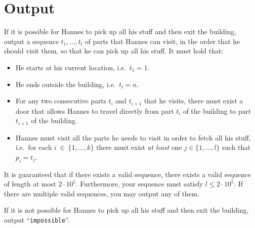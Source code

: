 \section*{Output}
If it is possible for Hannes to pick up all his stuff and then exit the
building, output a sequence $t_1,\ldots,t_l$ of parts that Hannes can visit, in
the order that he should visit them, so that he can pick up all his stuff. It
must hold that:
\begin{itemize}
    \item He starts at his current location, i.e.\ $t_1 = 1$.
    \item He ends outside the building, i.e.\ $t_l = n$.
    \item For any two consecutive parts $t_i$ and $t_{i+1}$ that he visits,
    there must exist a door that allows Hannes to travel directly from part $t_i$
    of the building to part $t_{i+1}$ of the building.
    \item Hannes must visit all the parts he needs to visit in order to fetch
    all his stuff, i.e.\ for each $i~\in~\{1,\ldots,k\}$ there must exist
    \emph{at least} one $j\in\{1,\ldots,l\}$ such that $p_i = t_j$.
\end{itemize}

It is guaranteed that if there exists a valid sequence, there exists a valid
sequence of length at most $2\cdot 10^5$. Furthermore, your sequence must
satisfy $l \le 2\cdot 10^5$. If there are multiple valid sequences, you may
output any of them.

If it is not possible for Hannes to pick up all his stuff and then exit the
building, output ``\texttt{impossible}''.

